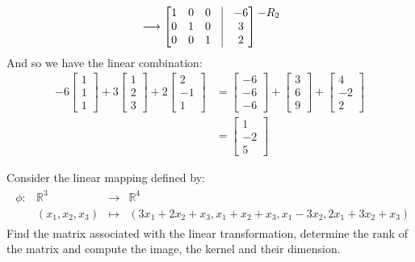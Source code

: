\documentclass[final,expand]{problemset}
\begin{document}
{\begin{align*}
		&\longrightarrow \begin{bmatrix}
			1 & 0 & 0 & \vline & -6\\
			0 & 1 & 0 &\vline & 3\\
			0 & 0 & 1 &\vline & 2
		\end{bmatrix}\begin{matrix}
			-R_2\\ \\ \\
		\end{matrix}\\
	\end{align*}
	And so we have the linear combination:
	\begin{align*}
		-6\begin{bmatrix}
			1\\1\\1
		\end{bmatrix} + 3\begin{bmatrix}
			1 \\2\\3
		\end{bmatrix} + 2\begin{bmatrix}
			2\\-1\\1
		\end{bmatrix} &= \begin{bmatrix}
			-6\\-6\\-6
		\end{bmatrix} + \begin{bmatrix}
			3 \\6\\9
		\end{bmatrix} + \begin{bmatrix}
			4\\-2\\2
		\end{bmatrix}\\
		&= \begin{bmatrix}
			1\\-2\\5
		\end{bmatrix}
	\end{align*}
}

\problem
Consider the linear mapping defined by:
\begin{align*}
	\begin{matrix}
		\phi: & \mathbb{R}^3 & \to & \mathbb{R}^4\\
		& (x_1, x_2, x_3) & \mapsto & (3x_1+2x_2+x_3, x_1+x_2+x_3, x_1-3x_2, 2x_1 + 3x_2 + x_3)
	\end{matrix}
\end{align*}
Find the matrix associated with the linear transformation, determine the rank of the matrix and compute the image, the kernel and their dimension.
\end{document}
